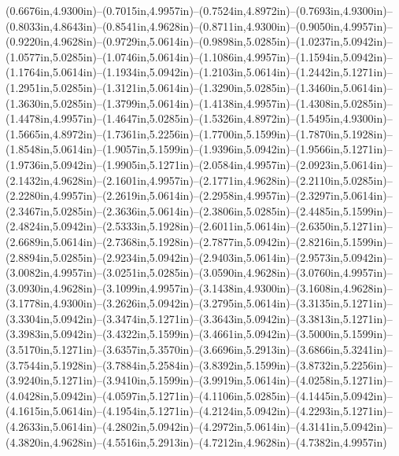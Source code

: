 (0.6676in,4.9300in)--(0.7015in,4.9957in)--(0.7524in,4.8972in)--(0.7693in,4.9300in)--(0.8033in,4.8643in)--(0.8541in,4.9628in)--(0.8711in,4.9300in)--(0.9050in,4.9957in)--(0.9220in,4.9628in)--(0.9729in,5.0614in)--(0.9898in,5.0285in)--(1.0237in,5.0942in)--(1.0577in,5.0285in)--(1.0746in,5.0614in)--(1.1086in,4.9957in)--(1.1594in,5.0942in)--(1.1764in,5.0614in)--(1.1934in,5.0942in)--(1.2103in,5.0614in)--(1.2442in,5.1271in)--(1.2951in,5.0285in)--(1.3121in,5.0614in)--(1.3290in,5.0285in)--(1.3460in,5.0614in)--(1.3630in,5.0285in)--(1.3799in,5.0614in)--(1.4138in,4.9957in)--(1.4308in,5.0285in)--(1.4478in,4.9957in)--(1.4647in,5.0285in)--(1.5326in,4.8972in)--(1.5495in,4.9300in)--(1.5665in,4.8972in)--(1.7361in,5.2256in)--(1.7700in,5.1599in)--(1.7870in,5.1928in)--(1.8548in,5.0614in)--(1.9057in,5.1599in)--(1.9396in,5.0942in)--(1.9566in,5.1271in)--(1.9736in,5.0942in)--(1.9905in,5.1271in)--(2.0584in,4.9957in)--(2.0923in,5.0614in)--(2.1432in,4.9628in)--(2.1601in,4.9957in)--(2.1771in,4.9628in)--(2.2110in,5.0285in)--(2.2280in,4.9957in)--(2.2619in,5.0614in)--(2.2958in,4.9957in)--(2.3297in,5.0614in)--(2.3467in,5.0285in)--(2.3636in,5.0614in)--(2.3806in,5.0285in)--(2.4485in,5.1599in)--(2.4824in,5.0942in)--(2.5333in,5.1928in)--(2.6011in,5.0614in)--(2.6350in,5.1271in)--(2.6689in,5.0614in)--(2.7368in,5.1928in)--(2.7877in,5.0942in)--(2.8216in,5.1599in)--(2.8894in,5.0285in)--(2.9234in,5.0942in)--(2.9403in,5.0614in)--(2.9573in,5.0942in)--(3.0082in,4.9957in)--(3.0251in,5.0285in)--(3.0590in,4.9628in)--(3.0760in,4.9957in)--(3.0930in,4.9628in)--(3.1099in,4.9957in)--(3.1438in,4.9300in)--(3.1608in,4.9628in)--(3.1778in,4.9300in)--(3.2626in,5.0942in)--(3.2795in,5.0614in)--(3.3135in,5.1271in)--(3.3304in,5.0942in)--(3.3474in,5.1271in)--(3.3643in,5.0942in)--(3.3813in,5.1271in)--(3.3983in,5.0942in)--(3.4322in,5.1599in)--(3.4661in,5.0942in)--(3.5000in,5.1599in)--(3.5170in,5.1271in)--(3.6357in,5.3570in)--(3.6696in,5.2913in)--(3.6866in,5.3241in)--(3.7544in,5.1928in)--(3.7884in,5.2584in)--(3.8392in,5.1599in)--(3.8732in,5.2256in)--(3.9240in,5.1271in)--(3.9410in,5.1599in)--(3.9919in,5.0614in)--(4.0258in,5.1271in)--(4.0428in,5.0942in)--(4.0597in,5.1271in)--(4.1106in,5.0285in)--(4.1445in,5.0942in)--(4.1615in,5.0614in)--(4.1954in,5.1271in)--(4.2124in,5.0942in)--(4.2293in,5.1271in)--(4.2633in,5.0614in)--(4.2802in,5.0942in)--(4.2972in,5.0614in)--(4.3141in,5.0942in)--(4.3820in,4.9628in)--(4.5516in,5.2913in)--(4.7212in,4.9628in)--(4.7382in,4.9957in) 